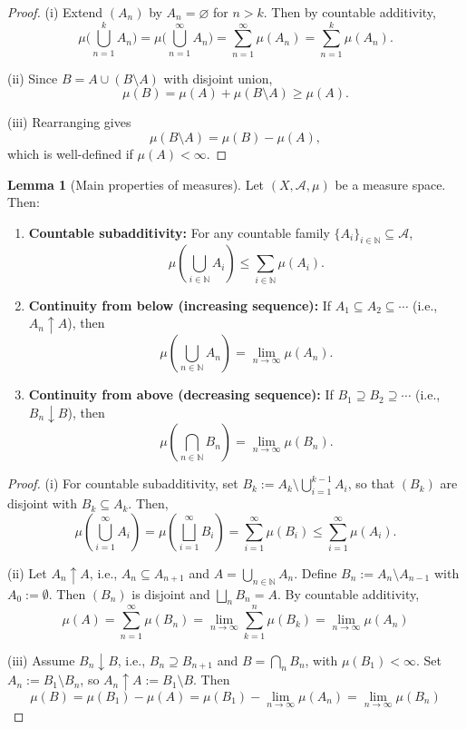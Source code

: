 \documentclass{article}
\theoremstyle{definition}
\newtheorem{lemma}[theorem]{Lemma}
\begin{document}
\begin{proof}
(i) Extend \((A_n)\) by \(A_n = \varnothing\) for \(n > k\). Then by countable additivity,
\[
\mu\big(\bigcup_{n=1}^k A_n\big) = \mu\big(\bigcup_{n=1}^\infty A_n\big) = \sum_{n=1}^\infty \mu(A_n) = \sum_{n=1}^k \mu(A_n).
\]

(ii) Since \(B = A \cup (B \setminus A)\) with disjoint union,
\[
\mu(B) = \mu(A) + \mu(B \setminus A) \geq \mu(A).
\]

(iii) Rearranging gives
\[
\mu(B \setminus A) = \mu(B) - \mu(A),
\]
which is well-defined if \(\mu(A) < \infty\).
\end{proof}


\medskip
\begin{lemma}[Main properties of measures]
Let \((X, \mathcal{A}, \mu)\) be a measure space. Then:
\medskip
\begin{enumerate}
    \item[(i)] \textbf{Countable subadditivity:} For any countable family \(\{A_i\}_{i \in \mathbb{N}} \subseteq \mathcal{A}\),
    \[
    \mu\left( \bigcup_{i \in \mathbb{N}} A_i \right) \leq \sum_{i \in \mathbb{N}} \mu(A_i).
    \]

    \item[(ii)] \textbf{Continuity from below (increasing sequence):} If \(A_1 \subseteq A_2 \subseteq \cdots\) (i.e., \(A_n \uparrow A\)), then
    \[
    \mu\left( \bigcup_{n \in \mathbb{N}} A_n \right) = \lim_{n \to \infty} \mu(A_n).
    \]

    \item[(iii)] \textbf{Continuity from above (decreasing sequence):} If \(B_1 \supseteq B_2 \supseteq \cdots\) (i.e., \(B_n \downarrow B\)), then
    \[
    \mu\left( \bigcap_{n \in \mathbb{N}} B_n \right) = \lim_{n \to \infty} \mu(B_n).
    \]
\end{enumerate}
\end{lemma}

\medskip
\begin{proof}
(i) For countable subadditivity, set \(B_k := A_k \setminus \bigcup_{i=1}^{k-1} A_i\), so that \((B_k)\) are disjoint with \(B_k \subseteq A_k\). Then,
\[
\mu\left(\bigcup_{i=1}^\infty A_i\right) = \mu\left(\bigsqcup_{i=1}^\infty B_i\right) = \sum_{i=1}^\infty \mu(B_i) \leq \sum_{i=1}^\infty \mu(A_i).
\]

\vspace{3em}
(ii) Let \( A_n \uparrow A \), i.e., \( A_n \subseteq A_{n+1} \) and \( A = \bigcup_{n \in \mathbb{N}} A_n \). Define \( B_n := A_n \setminus A_{n-1} \) with \( A_0 := \emptyset \). Then \( (B_n) \) is disjoint and \( \bigsqcup_{n} B_n = A \). By countable additivity,
\[
\mu(A) = \sum_{n=1}^\infty \mu(B_n) = \lim_{n \to \infty} \sum_{k=1}^n \mu(B_k) = \lim_{n \to \infty} \mu(A_n) 
\]

\vspace{3em}
(iii) Assume \(B_n \downarrow B\), i.e., \(B_n \supseteq B_{n+1}\) and \(B = \bigcap_{n} B_n\), with \(\mu(B_1) < \infty\). Set \(A_n := B_1 \setminus B_n\), so \(A_n \uparrow A := B_1 \setminus B\). Then
\[
\mu(B) = \mu(B_1) - \mu(A) = \mu(B_1) - \lim_{n \to \infty} \mu(A_n) = \lim_{n \to \infty} \mu(B_n)
\]
\end{proof}
\end{document}
